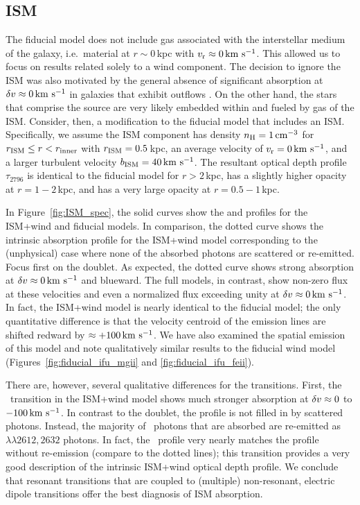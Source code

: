 \documentclass[12pt,preprint]{aastex}
\begin{document}
\subsection{ISM}
\label{sec:ISM}

The fiducial model does not include gas associated with
the interstellar medium of the galaxy, i.e.\ material at $r \sim
0$\,kpc with $v_{\rm r} \approx 0 \, {\rm km~s^{-1}}$.  This allowed us to focus on
results related solely to a wind component.  The decision to ignore the ISM
was also motivated by the general absence of significant absorption at
$\delta v \approx 0 \, {\rm km~s^{-1}}$ in galaxies that exhibit outflows 
\citep[e.g.][]{wcp+09,rwk+10,steidel+10}.
On the other hand, the stars that comprise the
source are very likely embedded within and fueled by gas
of the ISM.  
Consider, then, a modification to the fiducial model that 
includes an ISM. 
Specifically, we assume the ISM component has density $n_{\rm H} = 1 \, {\rm cm^{-3}}$ for
$r_{\rm ISM} \le r < r_{\rm inner}$ with $r_{\rm ISM} = 0.5$\,kpc, 
an average velocity of $v_{\rm r} = 0 \, {\rm km~s^{-1}}$, and a larger turbulent velocity $b_{\rm ISM} = 40 \, {\rm km~s^{-1}}$.
The resultant optical depth profile $\tau_{2796}$ is identical to the
fiducial model for $r > 2$\,kpc, has a slightly higher opacity at
$r=1-2$\,kpc, and has a very large opacity at $r = 0.5-1$\,kpc.

In Figure~\ref{fig:ISM_spec}, the solid curves show the  and
 profiles for the ISM+wind and fiducial 
models. In comparison, the
dotted curve shows the intrinsic absorption profile for the ISM+wind
model corresponding to the (unphysical) case
where none of the absorbed photons are scattered or re-emitted.   Focus first on the
 doublet.  As expected, the dotted curve shows strong
absorption at $\delta v \approx 0 \, {\rm km~s^{-1}}$ and blueward.  The full models,
in contrast, show non-zero flux at these velocities and even a
normalized flux exceeding unity at $\delta v \approx 0 \, {\rm km~s^{-1}}$.  In
fact, the ISM+wind model is nearly identical to the fiducial model;
the only quantitative difference is that the velocity centroid of
the emission lines are shifted redward by $\approx +100 \, {\rm km~s^{-1}}$.
We have also examined the spatial emission of this model and note
qualitatively similar results to the fiducial wind model
(Figures~\ref{fig:fiducial_ifu_mgii} and \ref{fig:fiducial_ifu_feii}).

There are, however, several qualitative differences 
for the  transitions. 
First, the \feiia\ transition in the ISM+wind model
shows much stronger absorption at $\delta v \approx 0$
to $-100 \, {\rm km~s^{-1}}$.  In contrast to the  doublet,
the profile is not filled in by scattered photons. Instead, 
the majority of \feiia\ photons that are absorbed are re-emitted as
\feiis$\lambda\lambda 2612, 2632$ photons.  In fact, the
\feiia\ profile very nearly matches the profile without re-emission 
(compare to the dotted lines); this transition provides a
very good description of the intrinsic ISM+wind optical depth profile.  
We conclude that resonant transitions that are coupled to (multiple)
non-resonant, electric dipole transitions offer the best
diagnosis of ISM absorption.
\end{document}
